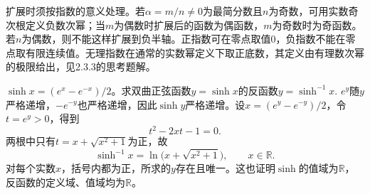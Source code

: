 扩展时须按指数的意义处理。若\(\alpha=m/n\ne0\)为最简分数且\(n\)为奇数，可用实数奇次根定义负数次幂；当\(m\)为偶数时扩展后的函数为偶函数，\(m\)为奇数时为奇函数。若\(n\)为偶数，则不能这样扩展到负半轴。正指数可在零点取值\(0\)，负指数不能在零点取有限连续值。无理指数在通常的实数幂定义下取正底数，其定义由有理数次幂的极限给出，见2.3.3的思考题解。


\(\sinh x=(e^x-e^{-x})/2\)。求双曲正弦函数\(y = \sinh x\)的反函数\(y = \sinh^{- 1} x\).
\solutionanswer
\(e^y\)随\(y\)严格递增，\(-e^{-y}\)也严格递增，因此\(\sinh y\)严格递增。设\(x=(e^y-e^{-y})/2\)，令\(t=e^y>0\)，得到
\[
t^2-2xt-1=0.
\]
两根中只有\(t=x+\sqrt{x^2+1}\)为正，故
\[
\sinh^{-1}x=\ln\bigl(x+\sqrt{x^2+1}\bigr),\qquad x\in\mathbb R.
\]
对每个实数\(x\)，括号内都为正，所求的\(y\)存在且唯一。这也证明\(\sinh\)的值域为\(\mathbb R\)，反函数的定义域、值域均为\(\mathbb R\)。
\par

